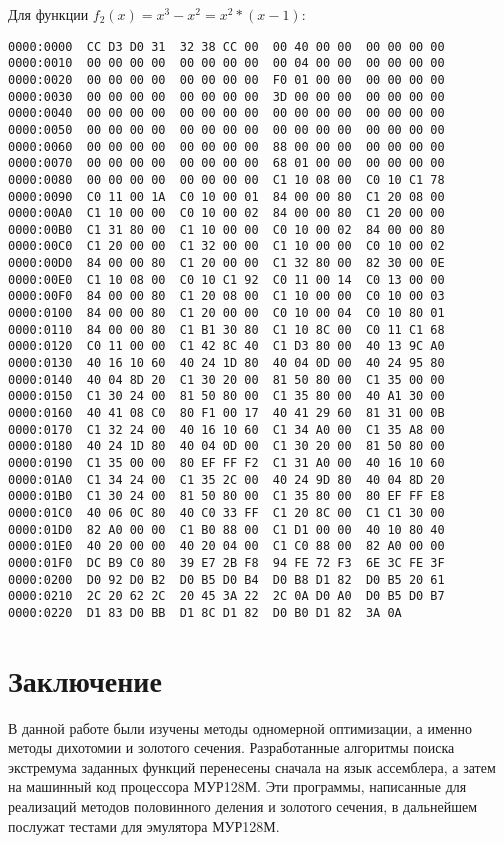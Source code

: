 \documentclass[12pt,a4paper,oneside]{report}
\begin{document}
Для функции $f_2(x)=x^3-x^2=x^2*(x-1)$:
\begin{verbatim}
0000:0000  CC D3 D0 31  32 38 CC 00  00 40 00 00  00 00 00 00
0000:0010  00 00 00 00  00 00 00 00  00 04 00 00  00 00 00 00
0000:0020  00 00 00 00  00 00 00 00  F0 01 00 00  00 00 00 00
0000:0030  00 00 00 00  00 00 00 00  3D 00 00 00  00 00 00 00
0000:0040  00 00 00 00  00 00 00 00  00 00 00 00  00 00 00 00
0000:0050  00 00 00 00  00 00 00 00  00 00 00 00  00 00 00 00
0000:0060  00 00 00 00  00 00 00 00  88 00 00 00  00 00 00 00
0000:0070  00 00 00 00  00 00 00 00  68 01 00 00  00 00 00 00
0000:0080  00 00 00 00  00 00 00 00  C1 10 08 00  C0 10 C1 78
0000:0090  C0 11 00 1A  C0 10 00 01  84 00 00 80  C1 20 08 00
0000:00A0  C1 10 00 00  C0 10 00 02  84 00 00 80  C1 20 00 00
0000:00B0  C1 31 80 00  C1 10 00 00  C0 10 00 02  84 00 00 80
0000:00C0  C1 20 00 00  C1 32 00 00  C1 10 00 00  C0 10 00 02
0000:00D0  84 00 00 80  C1 20 00 00  C1 32 80 00  82 30 00 0E
0000:00E0  C1 10 08 00  C0 10 C1 92  C0 11 00 14  C0 13 00 00
0000:00F0  84 00 00 80  C1 20 08 00  C1 10 00 00  C0 10 00 03
0000:0100  84 00 00 80  C1 20 00 00  C0 10 00 04  C0 10 80 01
0000:0110  84 00 00 80  C1 B1 30 80  C1 10 8C 00  C0 11 C1 68
0000:0120  C0 11 00 00  C1 42 8C 40  C1 D3 80 00  40 13 9C A0
0000:0130  40 16 10 60  40 24 1D 80  40 04 0D 00  40 24 95 80
0000:0140  40 04 8D 20  C1 30 20 00  81 50 80 00  C1 35 00 00
0000:0150  C1 30 24 00  81 50 80 00  C1 35 80 00  40 A1 30 00
0000:0160  40 41 08 C0  80 F1 00 17  40 41 29 60  81 31 00 0B
0000:0170  C1 32 24 00  40 16 10 60  C1 34 A0 00  C1 35 A8 00
0000:0180  40 24 1D 80  40 04 0D 00  C1 30 20 00  81 50 80 00
0000:0190  C1 35 00 00  80 EF FF F2  C1 31 A0 00  40 16 10 60
0000:01A0  C1 34 24 00  C1 35 2C 00  40 24 9D 80  40 04 8D 20
0000:01B0  C1 30 24 00  81 50 80 00  C1 35 80 00  80 EF FF E8
0000:01C0  40 06 0C 80  40 C0 33 FF  C1 20 8C 00  C1 C1 30 00
0000:01D0  82 A0 00 00  C1 B0 88 00  C1 D1 00 00  40 10 80 40
0000:01E0  40 20 00 00  40 20 04 00  C1 C0 88 00  82 A0 00 00
0000:01F0  DC B9 C0 80  39 E7 2B F8  94 FE 72 F3  6E 3C FE 3F
0000:0200  D0 92 D0 B2  D0 B5 D0 B4  D0 B8 D1 82  D0 B5 20 61
0000:0210  2C 20 62 2C  20 45 3A 22  2C 0A D0 A0  D0 B5 D0 B7
0000:0220  D1 83 D0 BB  D1 8C D1 82  D0 B0 D1 82  3A 0A
\end{verbatim}

\chapter*{Заключение}
В данной работе были изучены методы одномерной оптимизации, а именно методы дихотомии и золотого сечения. Разработанные алгоритмы поиска экстремума заданных функций перенесены сначала на язык ассемблера, а затем на машинный код процессора МУР128М. Эти программы, написанные для реализаций методов половинного деления и золотого сечения, в дальнейшем послужат тестами для эмулятора МУР128М.
\end{document}

